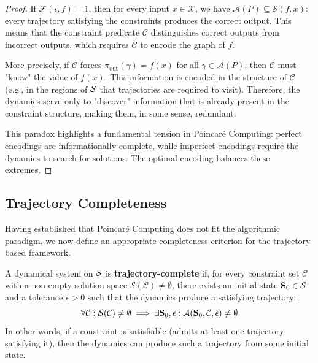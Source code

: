 \begin{proof}
If $\mathcal{F}(\iota, f) = 1$, then for every input $x \in \mathcal{X}$, we have $\mathcal{A}(P) \subseteq \mathcal{S}(f, x)$: every trajectory satisfying the constraints produces the correct output. This means that the constraint predicate $\mathcal{C}$ distinguishes correct outputs from incorrect outputs, which requires $\mathcal{C}$ to encode the graph of $f$.

More precisely, if $\mathcal{C}$ forces $\pi_{\text{out}}(\gamma) = f(x)$ for all $\gamma \in \mathcal{A}(P)$, then $\mathcal{C}$ must "know" the value of $f(x)$. This information is encoded in the structure of $\mathcal{C}$ (e.g., in the regions of $\mathcal{S}$ that trajectories are required to visit). Therefore, the dynamics serve only to "discover" information that is already present in the constraint structure, making them, in some sense, redundant.

This paradox highlights a fundamental tension in Poincaré Computing: perfect encodings are informationally complete, while imperfect encodings require the dynamics to search for solutions. The optimal encoding balances these extremes.
\end{proof}

\subsection{Trajectory Completeness}

Having established that Poincaré Computing does not fit the algorithmic paradigm, we now define an appropriate completeness criterion for the trajectory-based framework.

\begin{definition}
\label{def:trajectory_complete}
A dynamical system on $\mathcal{S}$ is \textbf{trajectory-complete} if, for every constraint set $\mathcal{C}$ with a non-empty solution space $\mathcal{S}(\mathcal{C}) \neq \emptyset$, there exists an initial state $\mathbf{S}_0 \in \mathcal{S}$ and a tolerance $\epsilon > 0$ such that the dynamics produce a satisfying trajectory:
\begin{equation}
\forall \mathcal{C} : \mathcal{S}(\mathcal{C}) \neq \emptyset \implies \exists \mathbf{S}_0, \epsilon : \mathcal{A}(\mathbf{S}_0, \mathcal{C}, \epsilon) \neq \emptyset
\label{eq:trajectory_completeness}
\end{equation}
In other words, if a constraint is satisfiable (admits at least one trajectory satisfying it), then the dynamics can produce such a trajectory from some initial state.
\end{definition}

